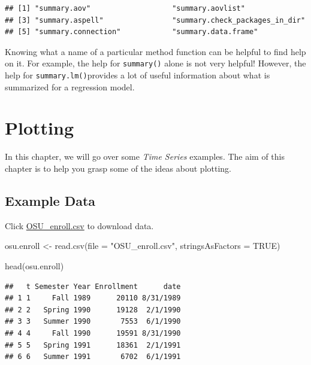\documentclass[
]{book}
\newenvironment{Shaded}{\begin{snugshade}}{\end{snugshade}}
\newcommand{\AttributeTok}[1]{\textcolor[rgb]{0.77,0.63,0.00}{#1}}
\newcommand{\ConstantTok}[1]{\textcolor[rgb]{0.00,0.00,0.00}{#1}}
\newcommand{\FunctionTok}[1]{\textcolor[rgb]{0.00,0.00,0.00}{#1}}
\newcommand{\NormalTok}[1]{#1}
\newcommand{\OtherTok}[1]{\textcolor[rgb]{0.56,0.35,0.01}{#1}}
\newcommand{\StringTok}[1]{\textcolor[rgb]{0.31,0.60,0.02}{#1}}
\theoremstyle{definition}
\theoremstyle{definition}
\theoremstyle{definition}
\theoremstyle{definition}
\theoremstyle{remark}
\begin{document}
\begin{verbatim}
## [1] "summary.aov"                   "summary.aovlist"              
## [3] "summary.aspell"                "summary.check_packages_in_dir"
## [5] "summary.connection"            "summary.data.frame"
\end{verbatim}

Knowing what a name of a particular method function can be helpful to find help on it. For example, the help for \texttt{summary()} alone is not very helpful! However, the help for \texttt{summary.lm()}provides a lot of useful information about what is summarized for a regression model.

\hypertarget{plotting}{%
\chapter{Plotting}\label{plotting}}

In this chapter, we will go over some \emph{Time Series} examples.
The aim of this chapter is to help you grasp some of the ideas about plotting.

\hypertarget{example-data}{%
\section{Example Data}\label{example-data}}

Click \href{http://www.chrisbilder.com/stat878/sections/2/OSU_enroll.csv}{OSU\_enroll.csv} to download data.

\begin{Shaded}
\begin{Highlighting}[]
\NormalTok{osu.enroll }\OtherTok{\textless{}{-}} \FunctionTok{read.csv}\NormalTok{(}\AttributeTok{file =} \StringTok{"OSU\_enroll.csv"}\NormalTok{, }
    \AttributeTok{stringsAsFactors =} \ConstantTok{TRUE}\NormalTok{)}
\end{Highlighting}
\end{Shaded}

\begin{Shaded}
\begin{Highlighting}[]
\FunctionTok{head}\NormalTok{(osu.enroll)}
\end{Highlighting}
\end{Shaded}

\begin{verbatim}
##   t Semester Year Enrollment      date
## 1 1     Fall 1989      20110 8/31/1989
## 2 2   Spring 1990      19128  2/1/1990
## 3 3   Summer 1990       7553  6/1/1990
## 4 4     Fall 1990      19591 8/31/1990
## 5 5   Spring 1991      18361  2/1/1991
## 6 6   Summer 1991       6702  6/1/1991
\end{verbatim}
\end{document}
